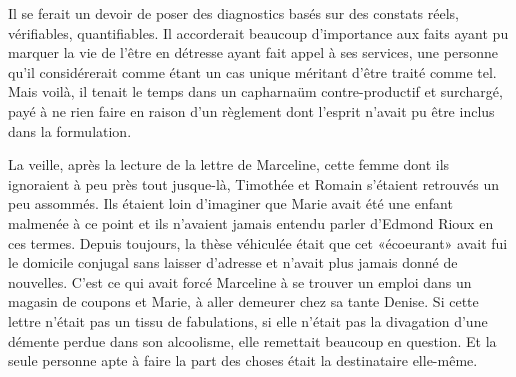 
Il se ferait un devoir de poser des diagnostics basés sur des constats réels, vérifiables, quantifiables. Il accorderait beaucoup d’importance aux faits ayant pu marquer la vie de l’être en détresse ayant fait appel à ses services, une personne qu’il considérerait comme étant un cas unique méritant d’être traité comme tel. Mais voilà, il tenait le temps dans un capharnaüm contre-productif et surchargé, payé à ne rien faire en raison d’un règlement dont l’esprit n’avait pu être inclus dans la formulation.

La veille, après la lecture de la lettre de Marceline, cette femme dont ils ignoraient à peu près tout jusque-là, Timothée et Romain s’étaient retrouvés un peu assommés. Ils étaient loin d’imaginer que Marie avait été une enfant malmenée à ce point et ils n’avaient jamais entendu parler d’Edmond Rioux en ces termes. Depuis toujours, la thèse véhiculée était que cet «écoeurant» avait fui le domicile conjugal sans laisser d’adresse et n’avait plus jamais donné de nouvelles. C’est ce qui avait forcé Marceline à se trouver un emploi dans un magasin de coupons et Marie, à aller demeurer chez sa tante Denise. Si cette lettre n’était pas un tissu de fabulations, si elle n’était pas la divagation d’une démente perdue dans son alcoolisme, elle remettait beaucoup en question. Et la seule personne apte à faire la part des choses était la destinataire elle-même.

